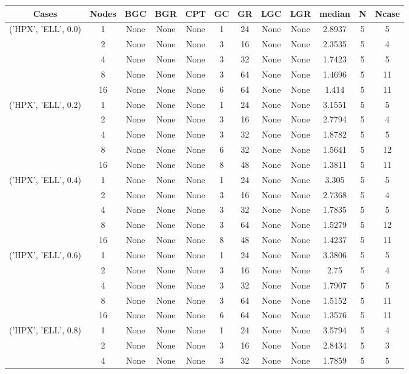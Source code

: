 \begin{tabular}{cccccccccccc}
\hline
Cases & Nodes& BGC& BGR& CPT& GC& GR& LGC& LGR& median & N & Ncase \\
\hline
\multirow{5}{*}{('HPX', 'ELL', 0.0)}& 1& None& None& None& 1& 24& None& None& 2.8937& 5& 5\\
& 2& None& None& None& 3& 16& None& None& 2.3535& 5& 4\\
& 4& None& None& None& 3& 32& None& None& 1.7423& 5& 5\\
& 8& None& None& None& 3& 64& None& None& 1.4696& 5& 11\\
& 16& None& None& None& 6& 64& None& None& 1.414& 5& 11\\
\hline
\multirow{5}{*}{('HPX', 'ELL', 0.2)}& 1& None& None& None& 1& 24& None& None& 3.1551& 5& 5\\
& 2& None& None& None& 3& 16& None& None& 2.7794& 5& 4\\
& 4& None& None& None& 3& 32& None& None& 1.8782& 5& 5\\
& 8& None& None& None& 6& 32& None& None& 1.5641& 5& 12\\
& 16& None& None& None& 8& 48& None& None& 1.3811& 5& 11\\
\hline
\multirow{5}{*}{('HPX', 'ELL', 0.4)}& 1& None& None& None& 1& 24& None& None& 3.305& 5& 5\\
& 2& None& None& None& 3& 16& None& None& 2.7368& 5& 4\\
& 4& None& None& None& 3& 32& None& None& 1.7835& 5& 5\\
& 8& None& None& None& 3& 64& None& None& 1.5279& 5& 12\\
& 16& None& None& None& 8& 48& None& None& 1.4237& 5& 11\\
\hline
\multirow{5}{*}{('HPX', 'ELL', 0.6)}& 1& None& None& None& 1& 24& None& None& 3.3806& 5& 5\\
& 2& None& None& None& 3& 16& None& None& 2.75& 5& 4\\
& 4& None& None& None& 3& 32& None& None& 1.7907& 5& 5\\
& 8& None& None& None& 3& 64& None& None& 1.5152& 5& 11\\
& 16& None& None& None& 6& 64& None& None& 1.3576& 5& 11\\
\hline
\multirow{5}{*}{('HPX', 'ELL', 0.8)}& 1& None& None& None& 1& 24& None& None& 3.5794& 5& 4\\
& 2& None& None& None& 3& 16& None& None& 2.8434& 5& 3\\
& 4& None& None& None& 3& 32& None& None& 1.7859& 5& 5\\

\end{tabular}
